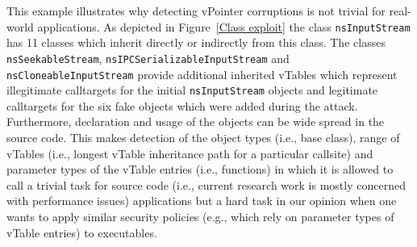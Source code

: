 This example illustrates why detecting vPointer corruptions is not trivial for real-world applications.
As depicted in Figure~\ref{Class exploit} the class \texttt{nsInputStream} has 11 classes which inherit directly
or indirectly from this class. The classes \texttt{nsSeekableStream}, \texttt{nsIPCSerializableInputStream}
and \texttt{nsCloneableInputStream} provide additional inherited vTables which represent illegitimate calltargets
for the initial \texttt{nsInputStream} objects and legitimate calltargets for the six fake objects which were added during the attack.
Furthermore, declaration and usage of the objects can be wide spread in the source code. This makes
detection of the object types (i.e., base class), range of vTables (i.e., longest vTable inheritance path for a particular callsite)
and parameter types of the vTable entries (i.e., functions) in which it is allowed to call a 
trivial task for source code (i.e., current research work is mostly concerned with performance issues)
applications but a hard task in our opinion when one wants to apply similar security policies 
(e.g., which rely on parameter types of vTable entries) to executables.





